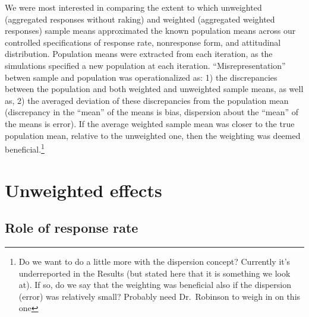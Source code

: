 \documentclass[
  man,mask]{apa7}
\begin{document}
We were most interested in comparing the extent to which unweighted (aggregated responses without raking) and weighted (aggregated weighted responses) sample means approximated the known population means across our controlled specifications of response rate, nonresponse form, and attitudinal distribution. Population means were extracted from each iteration, as the simulations specified a new population at each iteration. ``Misrepresentation'' betwen sample and population was operationalized as: 1) the discrepancies between the population and both weighted and unweighted sample means, as well as, 2) the averaged deviation of these discrepancies from the population mean (discrepancy in the ``mean'' of the means is bias, dispersion about the ``mean'' of the means is error). If the average weighted sample mean was closer to the true population mean, relative to the unweighted one, then the weighting was deemed beneficial.\footnote{Do we want to do a little more with the dispersion concept? Currently it's underreported in the Results (but stated here that it is something we look at). If so, do we say that the weighting was beneficial also if the dispersion (error) was relatively small? Probably need Dr.~Robinson to weigh in on this one}

\section{Unweighted effects}\label{unweighted-effects}

\subsection{Role of response rate}\label{role-of-response-rate}
\end{document}
